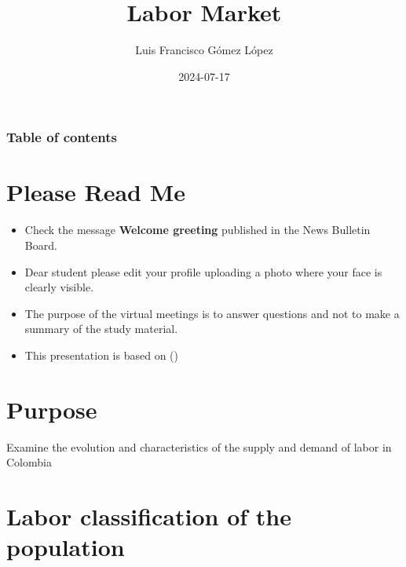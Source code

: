\documentclass[
  ignorenonframetext,
]{beamer}
\title{Labor Market}
\author{Luis Francisco Gómez López}
\date{2024-07-17}
\institute{FAEDIS}
\renewcommand*\contentsname{Table of contents}
\newcommand\contentsname{Table of contents}
\begin{document}
\frame{\titlepage}

\renewcommand*\contentsname{Table of contents}
\begin{frame}[allowframebreaks]
  \frametitle{Table of contents}
  \tableofcontents[hideallsubsections]
\end{frame}

\section{Please Read Me}\label{please-read-me}

\begin{frame}{}
\label{section}
\begin{itemize}
\item
  Check the message \textbf{Welcome greeting} published in the News
  Bulletin Board.
\item
  Dear student please edit your profile uploading a photo where your
  face is clearly visible.
\item
  The purpose of the virtual meetings is to answer questions and not to
  make a summary of the study material.
\item
  This presentation is based on
  ()
\end{itemize}
\end{frame}

\section{Purpose}\label{purpose}

\begin{frame}{}
\label{section-1}
Examine the evolution and characteristics of the supply and demand of
labor in Colombia
\end{frame}

\section{Labor classification of the
population}\label{labor-classification-of-the-population}
\end{document}
